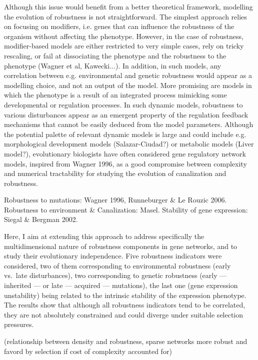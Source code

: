 \documentclass[a4paper]{article}
\begin{document}
Although this issue would benefit from a better theoretical framework, modelling the evolution of robustness is not straightforward. The simplest approach relies on focusing on modifiers, i.e. genes that can influence the robustness of the organism without affecting the phenotype. However, in the case of robustness, modifier-based models are either restricted to very simple cases, rely on tricky rescaling, or fail at dissociating the phenotype and the robustness to the phenotype (Wagner et al, Kawecki...). In addition, in such models, any correlation between e.g. environmental and genetic robustness would appear as a modelling choice, and not an output of the model. More promising are models in which the phenotype is a result of an integrated process mimicking some developmental or regulation processes. In such dynamic models, robustness to various disturbances appear as an emergent property of the regulation feedback mechanisms that cannot be easily deduced from the model parameters. Although the potential palette of relevant dynamic models is large and could include e.g. morphological development models (Salazar-Ciudad?) or metabolic models (Liver model?), evolutionary biologists have often considered gene regulatory network models, inspired from Wagner 1996, as a good compromise between complexity and numerical tractability for studying the evolution of canalization and robustness. 

Robustness to mutations: Wagner 1996, Runneburger \& Le Rouzic 2006. Robustness to environment \& Canalization: Masel. Stability of gene expression: Siegal \& Bergman 2002. 

Here, I aim at extending this approach to address specifically the multidimensional nature of robustness components in gene networks, and to study their evolutionary independence. Five robustness indicators were considered, two of them corresponding to environmental robustness (early vs.\ late disturbances), two corresponding to genetic robustness (early --- inherited --- or late --- acquired --- mutations), the last one (gene expression unstability) being related to the intrinsic stability of the expression phenotype. The results show that although all robustness indicators tend to be correlated, they are not absolutely constrained and could diverge under suitable selection pressures. 

\citep{Wag96} \citep{Wag94} \citep{RL16} 

\citep{SB02} 

\citep{Mas04} 

\citep{Lec08} (relationship between density and robustness, sparse networks more robust and favord by selection if cost of complexity accounted for) 
\end{document}
